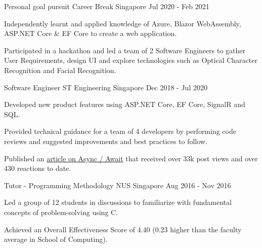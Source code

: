 \begin{cventries}
\cventry
{Personal goal pursuit} %
{Career Break} %
{Singapore} %
{Jul 2020 - Feb 2021} %
{
  \begin{cvitems} %
    \item {Independently learnt and applied knowledge of Azure, Blazor WebAssembly, ASP.NET Core \& EF Core to create a web application.}
    \item {Participated in a hackathon and led a team of 2 Software Engineers to gather User Requirements, design UI and explore technologies such as Optical Character Recognition and Facial Recognition.}
  \end{cvitems}
}

  \cventry
    {Software Engineer} %
    {ST Engineering} %
    {Singapore} %
    {Dec 2018 - Jul 2020} %
    {
      \begin{cvitems} %
        \item {Developed new product features using ASP.NET Core, EF Core, SignalR and SQL.}
        \item {Provided technical guidance for a team of 4 developers by performing code reviews and suggested improvements and best practices to follow.}
        \item {Published an \href{https://bit.ly/zy-async}{article on Async / Await} that received over 33k post views and over 430 reactions to date.}
      \end{cvitems}
    }


  \cventry
    {Tutor - Programming Methodology} %
    {NUS} %
    {Singapore} %
    {Aug 2016 - Nov 2016} %
    {
      \begin{cvitems} %
        \item {Led a group of 12 students in discussions to familiarize with fundamental concepts of problem-solving using C.}
        \item {Achieved an Overall Effectiveness Score of 4.40 (0.23 higher than the faculty average in School of Computing).}
      \end{cvitems}
    }

\end{cventries}
